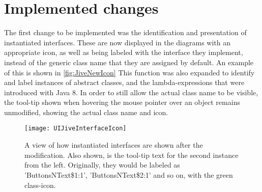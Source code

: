 \chapter{Implemented changes}\label{jiveImpl}%

The first change to be implemented was the identification and presentation of instantiated interfaces.
These are now displayed in the diagrams with an appropriate icon, as well as being labeled with the interface they implement, instead of the generic class name that they are assigned by default.
An example of this is shown in \autoref{fig:JiveNewIcon}
This function was also expanded to identify and label instances of abstract classes, and the lambda-expressions that were introduced with Java 8.
In order to still allow the actual class name to be visible, the tool-tip shown when hovering the mouse pointer over an object remains unmodified, showing the actual class name and icon.
\begin{figure}[H]
	\centering
	\texttt{[image: UIJiveInterfaceIcon]}
	\caption[A view of how instantiated interfaces are shown after the modification.]{A view of how instantiated interfaces are shown after the modification. Also shown, is the tool-tip text for the second instance from the left. Originally, they would be labeled as 'ButtonsNText\$1:1', 'ButtonsNText\$2:1' and so on, with the green class-icon.}
	\label{fig:JiveNewIcon}
\end{figure}

